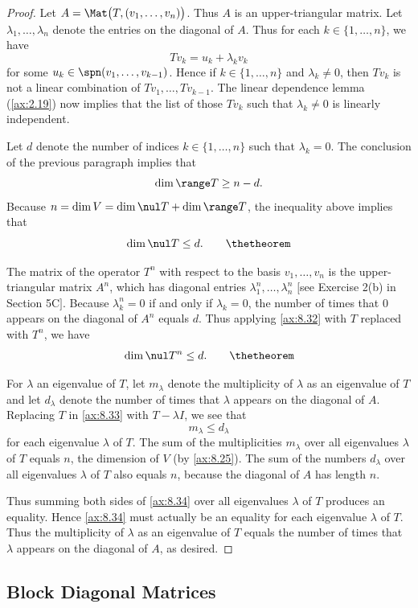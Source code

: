 \begin{proof}
Let $A=\Mat\bigl(T,(v_1,\dots,v_n)\bigr)$. Thus $A$ is an upper-triangular
matrix. Let $\lambda_1,\dots,\lambda_n$ denote the entries on the diagonal of
$A$. Thus for each $k\in\{1,\dots,n\}$, we have
\[ Tv_k = u_k+\lambda_kv_k \]
for some $u_k\in\spn(v_1,\dots,v_{k-1})$. Hence if $k\in\{1,\dots,n\}$ and
$\lambda_k\ne0$, then $Tv_k$ is not a linear combination of
$Tv_1,\dots,Tv_{k-1}$. The linear dependence lemma (\ref{ax:2.19}) now implies
that the list of those $Tv_k$ such that $\lambda_k\ne0$ is linearly
independent.

Let $d$ denote the number of indices $k\in\{1,\dots,n\}$ such that
$\lambda_k=0$. The conclusion of the previous paragraph implies that
\[ \dim\range T \ge n-d. \]
Because $n=\dim V=\dim\nul T+\dim\range T$, the inequality above implies
that%
\[ \dim\nul T \le d. \tag*{\thetheorem} \]

The matrix of the operator $T^n$ with respect to the basis $v_1,\dots,v_n$ is
the upper-triangular matrix $A^n$, which has diagonal entries
$\lambda_1^n,\dots,\lambda_n^n$ $\bigl[$see Exercise 2(b) in Section 5C$\bigr]$.
Because $\lambda_k^n=0$ if and only if $\lambda_k=0$, the number of times that
$0$ appears on the diagonal of $A^n$ equals $d$. Thus applying \ref{ax:8.32}
with $T$ replaced with $T^n$, we have%
\[ \dim\nul T^n \le d. \tag*{\thetheorem} \]

For $\lambda$ an eigenvalue of $T$, let $m_\lambda$ denote the multiplicity of
$\lambda$ as an eigenvalue of $T$ and let $d_\lambda$ denote the number of
times that $\lambda$ appears on the diagonal of $A$. Replacing $T$ in
\ref{ax:8.33} with $T-\lambda I$, we see that%
\[ m_\lambda \le d_\lambda \tag*{\thetheorem} \]
for each eigenvalue $\lambda$ of $T$. The sum of the multiplicities $m_\lambda$
over all eigenvalues $\lambda$ of $T$ equals $n$, the dimension of $V$ (by
\ref{ax:8.25}). The sum of the numbers $d_\lambda$ over all eigenvalues
$\lambda$ of $T$ also equals $n$, because the diagonal of $A$ has length $n$.

Thus summing both sides of \ref{ax:8.34} over all eigenvalues $\lambda$ of $T$
produces an equality. Hence \ref{ax:8.34} must actually be an equality for each
eigenvalue $\lambda$ of $T$. Thus the multiplicity of $\lambda$ as an
eigenvalue of $T$ equals the number of times that $\lambda$ appears on the
diagonal of $A$, as desired.
\end{proof}

\subsection{Block Diagonal Matrices}

